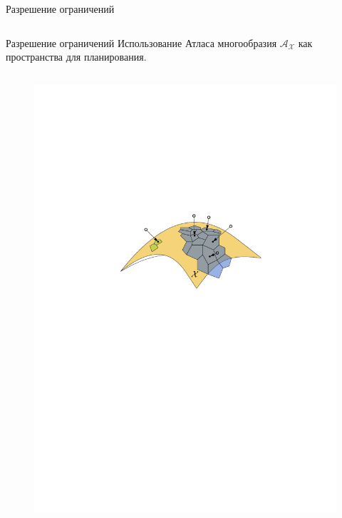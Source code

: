 \documentclass[11pt, aspectratio=169]{beamer}
\begin{document}
\begin{frame}{Разрешение ограничений}
\begin{columns}[onlytextwidth]
\begin{column}{0.58\textwidth}
        \end{column}
    \end{columns}
\end{frame}

\begin{frame}{Разрешение ограничений}
    Использование Атласа многообразия $\mathcal{A}_\mathcal{X}$ как пространства для планирования.
    \begin{columns}[onlytextwidth]
        \begin{column}{0.49\textwidth}
            \begin{figure}
                \centering
                \includegraphics[width=1.0\textwidth]{figures/graph/atlas_sampling.pdf}

\end{figure}
\end{column}
\end{columns}
\end{frame}
\end{document}
